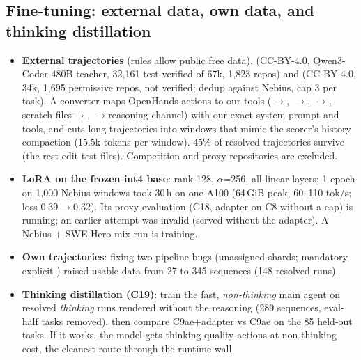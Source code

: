 \subsection{Fine-tuning: external data, own data, and thinking distillation}
\begin{itemize}
\item \textbf{External trajectories} (rules allow public free data).  (CC-BY-4.0,
Qwen3-Coder-480B teacher, 32{,}161 test-verified of 67k, 1{,}823 repos) and  (CC-BY-4.0, 34k, 1{,}695 permissive
repos, not verified; dedup against Nebius, cap 3 per task). A converter maps OpenHands actions to our tools
($\to$, $\to$, $\to$,
scratch files$\to$, $\to$reasoning channel) with our exact system prompt and tools, and cuts long trajectories
into windows that mimic the scorer's history compaction (15.5k tokens per window). 45\% of resolved trajectories survive (the rest
edit test files). Competition and proxy repositories are excluded.
\item \textbf{LoRA on the frozen int4 base}: rank 128, $\alpha$=256, all linear layers; 1 epoch on 1{,}000 Nebius windows took 30\,h on
one A100 (64\,GiB peak, 60--110 tok/s; loss 0.39$\to$0.32). Its proxy evaluation (C18, adapter on C8 without a cap) is running;
an earlier attempt was invalid (served without the adapter). A Nebius + SWE-Hero mix run is training.
\item \textbf{Own trajectories}: fixing two pipeline bugs (unassigned shards; mandatory explicit ) raised usable data
from 27 to 345 sequences (148 resolved runs).
\item \textbf{Thinking distillation (C19)}: train the fast, \emph{non-thinking} main agent on resolved \emph{thinking} runs rendered without
the reasoning (289 sequences, eval-half tasks removed), then compare C9ae+adapter vs C9ae on the 85 held-out tasks. If it works, the
model gets thinking-quality actions at non-thinking cost, the cleanest route through the runtime wall.
\end{itemize}


